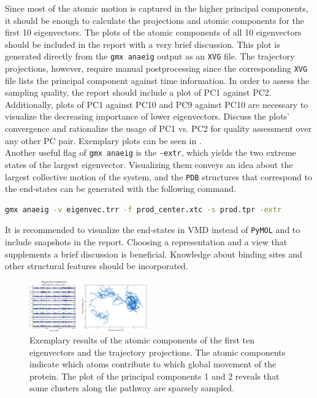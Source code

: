 \documentclass[9pt,tutorial]{livecoms}
\newcommand{\code}[1]{\colorbox{light-gray}{\texttt{#1}}}
\begin{document}
Since most of the atomic motion is captured in the higher principal components, it should be enough to calculate the projections and atomic components for the first \num{10} eigenvectors. The plots of the atomic components of all \num{10} eigenvectors should be included in the report with a very brief discussion. This plot is generated directly from the \code{gmx anaeig} output as an \texttt{XVG} file. The trajectory projections, however, require manual postprocessing since the corresponding \texttt{XVG} file lists the principal component against time information. In order to assess the sampling quality, the report should include a plot of PC1 against PC2. Additionally, plots of PC1 against PC10 and PC9 against PC10 are necessary to visualize the decreasing importance of lower eigenvectors. Discuss the plots' convergence and rationalize the usage of PC1 vs. PC2 for quality assessment over any other PC pair. Exemplary plots can be seen in .\\
Another useful flag of \code{gmx anaeig} is the \code{-extr}, which yields the two extreme states of the largest eigenvector. Visualizing them conveys an idea about the largest collective motion of the system, and the \texttt{PDB} structures that correspond to the end-states can be generated with the following command.
\begin{lstlisting}[language=bash]
gmx anaeig -v eigenvec.trr -f prod_center.xtc -s prod.tpr -extr
\end{lstlisting}
It is recommended to visualize the end-states in VMD instead of \texttt{PyMOL} and to include snapshots in the report. Choosing a representation and a view that supplements a brief discussion is beneficial. Knowledge about binding sites and other structural features should be incorporated.
\begin{figure}[H]
    \centering
    \includegraphics[width=0.45\textwidth]{figures/pca_examples.png}
    \caption{Exemplary results of the atomic components of the first ten eigenvectors and the trajectory projections. The atomic components indicate which atoms contribute to which global movement of the protein. The plot of the principal components 1 and 2 reveals that some clusters along the pathway are sparsely sampled.}
    \label{fig:expca}
\end{figure}
\end{document}
